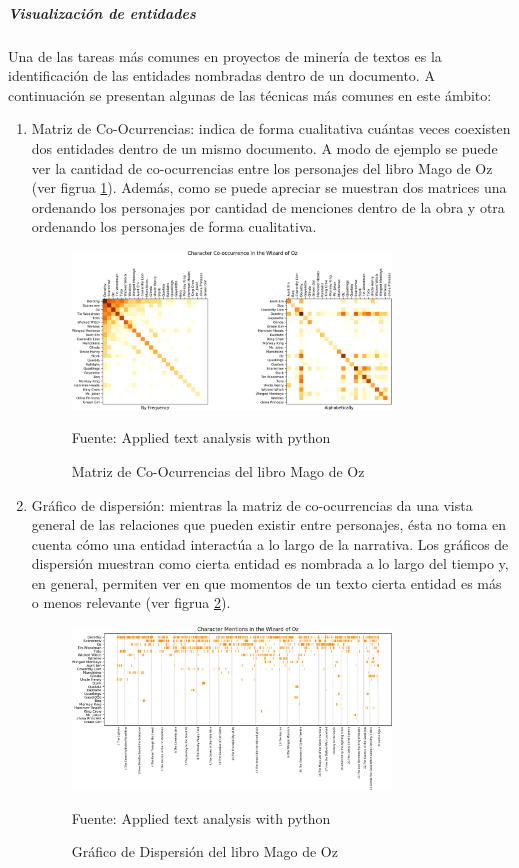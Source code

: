\subparagraph{Visualización  de entidades}
\subparagraph*{}
    Una de las tareas más comunes en proyectos de minería de textos es la identificación de las entidades nombradas dentro de un documento. A continuación se presentan algunas de las técnicas más comunes en este ámbito:
\begin{enumerate}
    \item Matriz de Co-Ocurrencias: indica de forma cualitativa cuántas veces coexisten dos entidades dentro de un mismo documento. A modo de ejemplo se puede ver la cantidad de co-ocurrencias entre los personajes del libro Mago de Oz (ver figrua \ref{fig:MatrizCoOcurrencias}). Además, como se puede apreciar se muestran dos matrices una ordenando los personajes por cantidad de menciones dentro de la obra y otra ordenando los personajes de forma cualitativa.  
    \begin{figure}[H]
        \centering
        \includegraphics[width=0.8\textwidth]{figures/MatrizCoOcurrencias.png}
        \caption{\label{fig:MatrizCoOcurrencias} Matriz de Co-Ocurrencias del libro Mago de Oz} Fuente: Applied text analysis with python \cite{bengfort2018applied}
    \end{figure}
    \item Gráfico de dispersión: mientras la matriz de co-ocurrencias da una vista general de las relaciones que pueden existir entre personajes, ésta no toma en cuenta cómo una entidad interactúa a lo largo de la narrativa. Los gráficos de dispersión muestran como cierta entidad es nombrada a lo largo del tiempo y, en general, permiten ver en que momentos de un texto cierta entidad es más o menos relevante (ver figrua \ref{fig:DispersionPLot}).
    \begin{figure}[H]
        \centering
        \includegraphics[width=0.8\textwidth]{figures/DispersionPlot.png}
        \caption{\label{fig:DispersionPLot} Gráfico de Dispersión del libro Mago de Oz} Fuente: Applied text analysis with python \cite{bengfort2018applied}
    \end{figure}
\end{enumerate}

